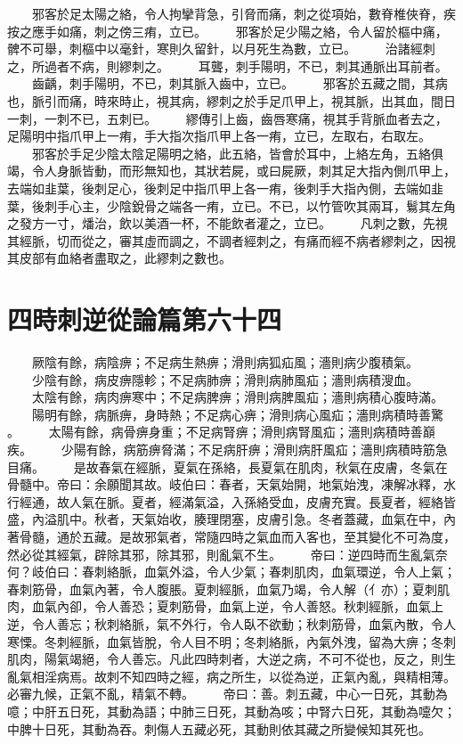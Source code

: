 　　邪客於足太陽之絡，令人拘攣背急，引脅而痛，刺之從項始，數脊椎俠脊，疾按之應手如痛，刺之傍三痏，立已。
　　邪客於足少陽之絡，令人留於樞中痛，髀不可舉，刺樞中以毫針，寒則久留針，以月死生為數，立已。
　　治諸經刺之，所過者不病，則繆刺之。
　　耳聾，刺手陽明，不已，刺其通脈出耳前者。
　　齒齲，刺手陽明，不已，刺其脈入齒中，立已。
　　邪客於五藏之間，其病也，脈引而痛，時來時止，視其病，繆刺之於手足爪甲上，視其脈，出其血，間日一刺，一刺不已，五刺已。
　　繆傳引上齒，齒唇寒痛，視其手背脈血者去之，足陽明中指爪甲上一痏，手大指次指爪甲上各一痏，立已，左取右，右取左。
　　邪客於手足少陰太陰足陽明之絡，此五絡，皆會於耳中，上絡左角，五絡俱竭，令人身脈皆動，而形無知也，其狀若屍，或曰屍厥，刺其足大指內側爪甲上，去端如韭葉，後刺足心，後刺足中指爪甲上各一痏，後刺手大指內側，去端如韭葉，後刺手心主，少陰銳骨之端各一痏，立已。不已，以竹管吹其兩耳，鬄其左角之發方一寸，燔治，飲以美酒一杯，不能飲者灌之，立已。
　　凡刺之數，先視其經脈，切而從之，審其虛而調之，不調者經刺之，有痛而經不病者繆刺之，因視其皮部有血絡者盡取之，此繆刺之數也。


\section{四時刺逆從論篇第六十四}

　　厥陰有餘，病陰痹；不足病生熱痹；滑則病狐疝風；濇則病少腹積氣。
　　少陰有餘，病皮痹隱軫；不足病肺痹；滑則病肺風疝；濇則病積溲血。
　　太陰有餘，病肉痹寒中；不足病脾痹；滑則病脾風疝；濇則病積心腹時滿。
　　陽明有餘，病脈痹，身時熱；不足病心痹；滑則病心風疝；濇則病積時善驚 。
　　太陽有餘，病骨痹身重；不足病腎痹；滑則病腎風疝；濇則病積時善巔疾。
　　少陽有餘，病筋痹脅滿；不足病肝痹；滑則病肝風疝；濇則病積時筋急目痛。
　　是故春氣在經脈，夏氣在孫絡，長夏氣在肌肉，秋氣在皮膚，冬氣在骨髓中。帝曰：余願聞其故。岐伯曰：春者，天氣始開，地氣始洩，凍解冰釋，水行經通，故人氣在脈。夏者，經滿氣溢，入孫絡受血，皮膚充實。長夏者，經絡皆盛，內溢肌中。秋者，天氣始收，腠理閉塞，皮膚引急。冬者蓋藏，血氣在中，內著骨髓，通於五藏。是故邪氣者，常隨四時之氣血而入客也，至其變化不可為度，然必從其經氣，辟除其邪，除其邪，則亂氣不生。
　　帝曰：逆四時而生亂氣奈何？岐伯曰：春刺絡脈，血氣外溢，令人少氣；春刺肌肉，血氣環逆，令人上氣；春刺筋骨，血氣內著，令人腹脹。夏刺經脈，血氣乃竭，令人解（亻亦）；夏刺肌肉，血氣內卻，令人善恐；夏刺筋骨，血氣上逆，令人善怒。秋刺經脈，血氣上逆，令人善忘；秋刺絡脈，氣不外行，令人臥不欲動；秋刺筋骨，血氣內散，令人寒慄。冬刺經脈，血氣皆脫，令人目不明；冬刺絡脈，內氣外洩，留為大痹；冬刺肌肉，陽氣竭絕，令人善忘。凡此四時刺者，大逆之病，不可不從也，反之，則生亂氣相淫病焉。故刺不知四時之經，病之所生，以從為逆，正氣內亂，與精相薄。必審九候，正氣不亂，精氣不轉。
　　帝曰：善。刺五藏，中心一日死，其動為噫；中肝五日死，其動為語；中肺三日死，其動為咳；中腎六日死，其動為嚏欠；中脾十日死，其動為吞。刺傷人五藏必死，其動則依其藏之所變候知其死也。


